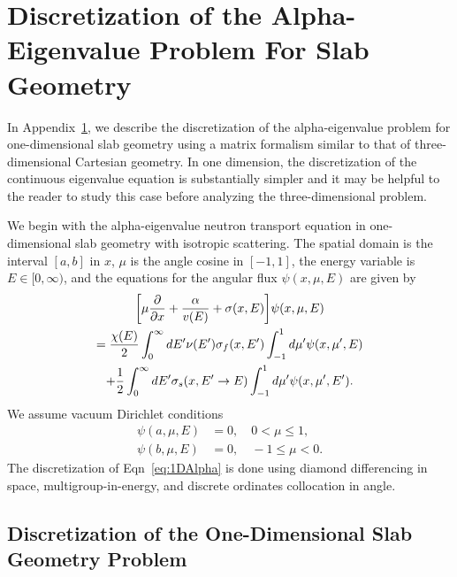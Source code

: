 \chapter[Discretization of the Alpha-Eigenvalue Problem For Slab Geometry][Discretized Slab Alpha-Eigenvalue Problem]{Discretization of the Alpha-Eigenvalue Problem For Slab Geometry}

\label{Discrete1D}

In Appendix~\ref{Discrete1D}, we describe the discretization of the alpha-eigenvalue problem for one-dimensional slab geometry using a matrix formalism similar to that of three-dimensional Cartesian geometry. In one dimension, the discretization of the continuous eigenvalue equation is substantially simpler and it may be helpful to the reader to study this case before analyzing the three-dimensional problem.

We begin with the alpha-eigenvalue neutron transport equation in one-dimensional slab geometry with isotropic scattering. The spatial domain is the interval $[a,b]$ in $x$, $\mu$ is the angle cosine in $[-1,1]$, the energy variable is $E \in [0, \infty)$, and the equations for the angular flux $\psi(x, \mu, E)$ are given by
\begin{multline}
\bigg [ \mu \frac{\partial}{\partial x} + \frac{\alpha}{v(E)} + \sigma(x,E) \bigg ] \psi(x,\mu,E) \\ = \frac{\chi(E)}{2} \int_{0}^{\infty} \mathop{}\!d E' \nu(E') \sigma_{f}(x,E') \int_{-1}^{1} \mathop{}\!d \mu' \psi(x,\mu',E) \\ + \frac{1}{2} \int_{0}^{\infty} \mathop{}\!d E' \sigma_{s}(x, E' \rightarrow E) \int_{-1}^{1} \mathop{}\!d \mu' \psi(x,\mu',E').
\label{eq:1DAlpha}
\end{multline}
We assume vacuum Dirichlet conditions
\begin{align}
	\psi(a, \mu, E) &=0, \quad 0 < \mu \leq 1, \\
        \psi(b, \mu, E) &=0, \quad -1 \leq \mu < 0.
\end{align}
The discretization of Eqn~\ref{eq:1DAlpha} is done using diamond differencing in space, multigroup-in-energy, and discrete ordinates collocation in angle.

\section{Discretization of the One-Dimensional Slab Geometry Problem}


